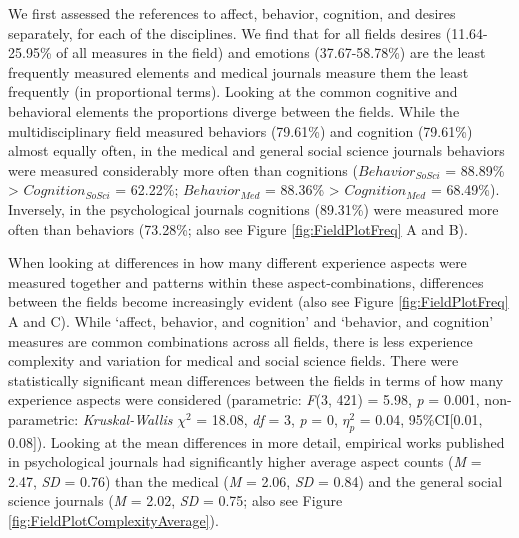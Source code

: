 We first assessed the references to affect, behavior, cognition, and
desires separately, for each of the disciplines. We find that for all
fields desires (11.64-25.95\% of all measures in the field) and emotions
(37.67-58.78\%) are the least frequently measured elements and medical
journals measure them the least frequently (in proportional terms).
Looking at the common cognitive and behavioral elements the proportions
diverge between the fields. While the multidisciplinary field measured
behaviors (79.61\%) and cognition (79.61\%) almost equally often, in the
medical and general social science journals behaviors were measured
considerably more often than cognitions (\(Behavior_{SoSci}\) = 88.89\%
\textgreater{} \(Cognition_{SoSci}\) = 62.22\%; \(Behavior_{Med}\) =
88.36\% \textgreater{} \(Cognition_{Med}\) = 68.49\%). Inversely, in the
psychological journals cognitions (89.31\%) were measured more often
than behaviors (73.28\%; also see Figure \ref{fig:FieldPlotFreq} A and
B).

When looking at differences in how many different experience aspects
were measured together and patterns within these aspect-combinations,
differences between the fields become increasingly evident (also see
Figure \ref{fig:FieldPlotFreq} A and C). While `affect, behavior, and
cognition' and `behavior, and cognition' measures are common
combinations across all fields, there is less experience complexity and
variation for medical and social science fields. There were
statistically significant mean differences between the fields in terms
of how many experience aspects were considered (parametric:
\textit{F}(3, 421) = 5.98, \textit{p} = 0.001, non-parametric:
\textit{Kruskal-Wallis} \(\chi^{2}\) = 18.08, \textit{df} = 3,
\textit{p} = 0, \(\eta_{p}^{2}\) = 0.04, 95\%CI{[}0.01, 0.08{]}).
Looking at the mean differences in more detail, empirical works
published in psychological journals had significantly higher average
aspect counts (\textit{M} = 2.47, \textit{SD} = 0.76) than the medical
(\textit{M} = 2.06, \textit{SD} = 0.84) and the general social science
journals (\textit{M} = 2.02, \textit{SD} = 0.75; also see Figure
\ref{fig:FieldPlotComplexityAverage}).

